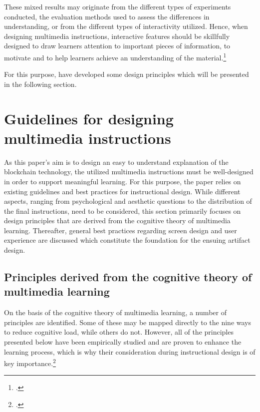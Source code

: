 These mixed results may originate from the different types of experiments conducted, the evaluation methods used to assess the differences in understanding, or from the different types of interactivity utilized. Hence, when designing multimedia instructions, interactive features should be skillfully designed to draw learners attention to important pieces of information, to motivate and to help learners achieve an understanding of the material.\footcites[Cf.][p.21]{KirshInteractivitymultimediainterfaces1997}[cf.][p.15]{LeeScreenDesignGuidelines1999}

For this purpose, \cite{MorenoInteractiveMultimodalLearning2007} have developed some design principles which will be presented in the following section.

\section{Guidelines for designing multimedia instructions} \label{sec:GuidelinesMultimediaInstr}
As this paper's aim is to design an easy to understand explanation of the blockchain technology, the utilized multimedia instructions must be well-designed in order to support meaningful learning. For this purpose, the paper relies on existing guidelines and best practices for instructional design. While different aspects, ranging from psychological and aesthetic questions to the distribution of the final instructions, need to be considered, this section primarily focuses on design principles that are derived from the cognitive theory of multimedia learning. Thereafter, general best practices regarding screen design and user experience are discussed which constitute the foundation for the ensuing artifact design.

\subsection{Principles derived from the cognitive theory of multimedia learning}
On the basis of the cognitive theory of multimedia learning, a number of principles are identified. Some of these may be mapped directly to the nine ways to reduce cognitive load, while others do not. However, all of the principles presented below have been empirically studied and are proven to enhance the learning process, which is why their consideration during instructional design is of key importance.\footcites[Cf. for more detail][]{SordenCognitiveTheoryMultimedia2012}

